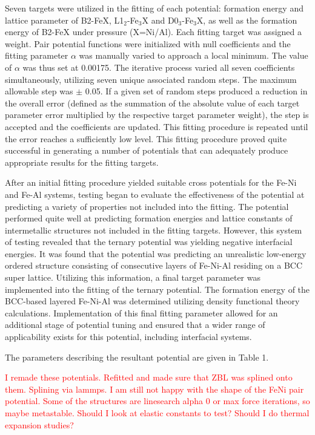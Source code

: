 \documentclass[review]{elsarticle}
\begin{document}
Seven targets were utilized in the fitting of each potential:  formation energy and lattice parameter of B2-FeX, L1$_{2}$-Fe$_{3}$X and D0$_{3}$-Fe$_{3}$X, as well as the formation energy of B2-FeX under pressure (X=Ni/Al).  Each fitting target was assigned a weight.  Pair potential functions were initialized with null coefficients and the fitting parameter $\alpha$ was manually varied to approach a local minimum.  The value of $\alpha$ was thus set at 0.00175.  The iterative process varied all seven coefficients simultaneously, utilizing seven unique associated random steps.  The maximum allowable step was $\pm$ 0.05.  If a given set of random steps produced a reduction in the overall error (defined as the summation of the absolute value of each target parameter error multiplied by the respective target parameter weight), the step is accepted and the coefficients are updated.  This fitting procedure is repeated until the error reaches a sufficiently low level.  This fitting procedure proved quite successful in generating a number of potentials that can adequately produce appropriate results for the fitting targets.  

After an initial fitting procedure yielded suitable cross potentials for the Fe-Ni and Fe-Al systems, testing began to evaluate the effectiveness of the potential at predicting a variety of properties not included into the fitting.  The potential performed quite well at predicting formation energies and lattice constants of intermetallic structures not included in the fitting targets.  However, this system of testing revealed that the ternary potential was yielding negative interfacial energies.  It was found that the potential was predicting an unrealistic low-energy ordered structure consisting of consecutive layers of Fe-Ni-Al residing on a BCC super lattice.  Utilizing this information, a final target parameter was implemented into the fitting of the ternary potential.  The formation energy of the BCC-based layered Fe-Ni-Al was determined utilizing density functional theory calculations.  Implementation of this final fitting parameter allowed for an additional stage of potential tuning and ensured that a wider range of applicability exists for this potential, including interfacial systems.  

The parameters describing the resultant potential are given in Table 1. 

\textcolor{red}{I remade these potentials. Refitted and made sure that ZBL was splined onto them. Splining via lammps. I am still not happy with the shape of the FeNi pair potential. Some of the structures are linesearch alpha 0 or max force iterations, so maybe metastable. Should I look at elastic constants to test? Should I do thermal expansion studies?}
\end{document}
